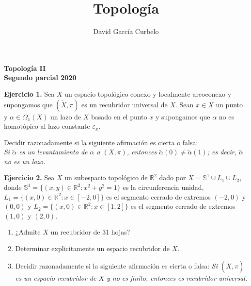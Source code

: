 \documentclass[fleqn]{article}
\author{David García Curbelo}
\title{Topología}
\def\R{\mathds{R}}
\def\S{\mathds{S}}
\begin{document}
    \doublespace

    \setcounter{page}{1}
    \pagestyle{plain}

    \begin{center}
        {\large\bf{Topología II}} \\
        \bf{Segundo parcial 2020}\\
        
    \end{center}

    \textbf{Ejercicio 1. } Sea $X$ un espacio topológico conexo y localmente arcoconexo y supongamos que $(\tilde{X}, \pi)$ es un recubridor universal
    de $X$. Sean $x \in X$ un punto y $\alpha \in \Omega_x(X)$ un lazo de $X$ basado en el punto $x$ y supongamos que $\alpha$ no es homotópico al lazo constante
    $\varepsilon_x$.

    Decidir razonadamente si la siguiente afirmación es cierta o falsa:\\
    \textit{Si $\tilde{\alpha}$ es un levantamiento de $\alpha$ a $(X, \pi)$, entonces $\tilde{\alpha} (0) \neq \tilde{\alpha} (1)$; es decir, 
    $\tilde{\alpha}$ no es un lazo.} 

    \newpage

    \textbf{Ejercicio 2. } Sea $X$ un subespacio topológico de $\R^2$ dado por $X = \S^1 \cup L_1 \cup L_2$, donde $\S^1 = \{(x,y) \in \R^2 : x^2 + y^2 = 1\}$ es la 
    circunferencia unidad, $L_1 = \{(x,0) \in \R^2 : x \in [-2,0] \}$ es el segmento cerrado de extremos $(-2,0)$ y $(0,0)$ y 
    $L_2 = \{(x,0) \in \R^2 : x \in [1,2] \}$ es el segmento cerrado de extremos $(1,0)$ y $(2,0)$.
    \begin{enumerate}
        \item ¿Admite $X$ un recubridor de 31 hojas?
        \item Determinar explicitamente un espacio recubridor de $X$.
        \item Decidir razonadamente si la siguiente afirmación es cierta o falsa: \textit{Si $(\tilde{X}, \pi)$ es un espacio recubridor de $X$ y no es 
                finito, entonces es recubridor universal.}
    \end{enumerate}

    \newpage
\end{document}
